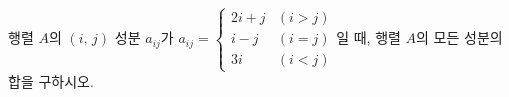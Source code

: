 \hspace*{2mm}\begin{minipage}[t]{\dimexpr\linewidth-2mm\relax}\vspace{0pt}
행렬 $A$의 $(i,\,j)$ 성분 $a_{ij}$가 $a_{ij}=\begin{cases} 2i+j & (i>j) \\ i-j & (i=j) \\ 3i & (i<j) \end{cases}$일 때, 행렬 $A$의 모든 성분의 합을 구하시오. \end{minipage}
